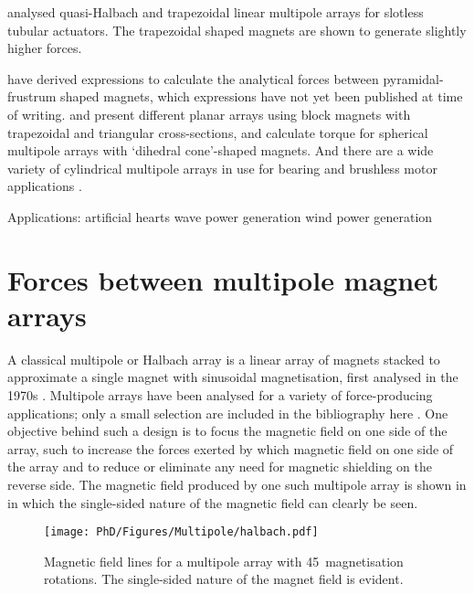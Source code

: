 \documentclass[11pt,a4paper]{memoir}
\begin{document}
\textcite{meessen2008-ietm} analysed quasi-Halbach and trapezoidal linear multipole arrays for slotless tubular actuators.
The trapezoidal shaped magnets are shown to generate slightly higher forces.

\textcite{choi2008}




\textcite{janssen2009-ietm} have derived expressions to calculate the analytical forces between pyramidal-frustrum shaped magnets, which expressions have not yet been published at time of writing.
\textcite{lee2006-mx} and \textcite{cho2001} present different planar arrays using block magnets with trapezoidal and triangular cross-sections, and \textcite{yan2006-iemx} calculate torque for spherical multipole arrays with `dihedral cone'-shaped magnets. And there are a wide variety of cylindrical multipole arrays in use for bearing and brushless motor applications \parencite{zhu2001-ipep}.



Applications:
artificial hearts \parencite{finocchiaro2008,samiappan2008}
wave power generation \parencite{kimoulakis2008}
wind power generation \parencite{liu2008-ietm}



\section{Forces between multipole magnet arrays}

A classical multipole or Halbach array is a linear array of magnets stacked to approximate a single magnet with sinusoidal magnetisation, first analysed in the 1970s \parencite{halbach1981,shute2000}. Multipole arrays have been analysed for a variety of force-producing applications; only a small selection are included in the bibliography here \parencite{lee2004-mx,robertson2005-ietm,rovers2009-ietm}. One objective behind such a design is to focus the magnetic field on one side of the array, such to increase the forces exerted by which magnetic field on one side of the array and to reduce or eliminate any need for magnetic shielding on the reverse side. The magnetic field produced by one such multipole array is shown in  in which the single-sided nature of the magnetic field can clearly be seen.

\begin{figure}
\centering
\texttt{[image: PhD/Figures/Multipole/halbach.pdf]}
\caption{Magnetic field lines for a multipole array with 45\textdegree\ magnetisation rotations. The single-sided nature of the magnet field is evident.}
\end{figure}
\end{document}
